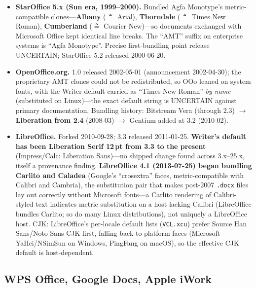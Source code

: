 \documentclass[10pt,a4paper]{article}
\newcommand{\code}[1]{\texttt{#1}}
\begin{document}
\begin{itemize}[leftmargin=1.2em,itemsep=2pt]
\item \textbf{StarOffice 5.x (Sun era, 1999--2000).} Bundled Agfa Monotype's
metric-compatible clones---\textbf{Albany} ($\triangleq$ Arial), \textbf{Thorndale}
($\triangleq$ Times New Roman), \textbf{Cumberland} ($\triangleq$ Courier New)---so
documents exchanged with Microsoft Office kept identical line breaks. The ``AMT''
suffix on enterprise systems is ``Agfa Monotype''. Precise first-bundling point release
UNCERTAIN; StarOffice 5.2 released 2000-06-20.\cite{s-staroffice,s-staroffice-2}
\item \textbf{OpenOffice.org.} 1.0 released 2002-05-01 (announcement 2002-04-30); the
proprietary AMT clones could not be redistributed, so OOo leaned on system fonts, with
the Writer default carried as ``Times New Roman'' \emph{by name} (substituted on
Linux)---the exact default string is UNCERTAIN against primary documentation. Bundling
history: Bitstream Vera (through 2.3) $\rightarrow$ \textbf{Liberation from 2.4}
(2008-03) $\rightarrow$ Gentium added at 3.2 (2010-02).\cite{s-ooo,s-ooo-2}
\item \textbf{LibreOffice.} Forked 2010-09-28; 3.3 released 2011-01-25. \textbf{Writer's
default has been Liberation Serif 12\,pt from 3.3 to the present} (Impress/Calc:
Liberation Sans)---no shipped change found across 3.x--25.x, itself a provenance
finding. \textbf{LibreOffice 4.1 (2013-07-25) began bundling Carlito and Caladea}
(Google's ``crosextra'' faces, metric-compatible with Calibri and Cambria), the
substitution pair that makes post-2007 \code{.docx} files lay out correctly without
Microsoft fonts---a Carlito rendering of Calibri-styled text indicates metric
substitution on a host lacking Calibri (LibreOffice bundles Carlito; so do many Linux
distributions), not uniquely a LibreOffice host. CJK: LibreOffice's per-locale default
lists (\code{VCL.xcu}) prefer Source Han Sans/Noto Sans CJK first, falling back to
platform faces (Microsoft YaHei/NSimSun on Windows, PingFang on macOS), so the effective
CJK default is host-dependent.\cite{s-lo,s-lo-2,s-lo41,s-lo41-2,s-lo41-3,s-lo-cjk}
\end{itemize}

\subsection{WPS Office, Google Docs, Apple iWork}\label{sec:wps}
\end{document}
